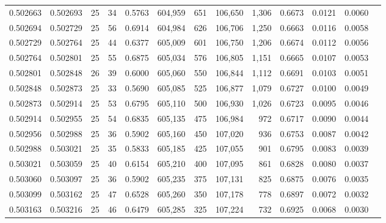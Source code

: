\begin{tabular}{rrrrrrrrrrrrr}
0.502663 & 0.502693 &    25 &  34 &                                     0.5763 & 604,959 &     651 & 106,650 &   1,306 & 0.6673 & 0.0121 & 0.0060 \\
0.502694 & 0.502729 &    25 &  56 &                                     0.6914 & 604,984 &     626 & 106,706 &   1,250 & 0.6663 & 0.0116 & 0.0058 \\
0.502729 & 0.502764 &    25 &  44 &                                     0.6377 & 605,009 &     601 & 106,750 &   1,206 & 0.6674 & 0.0112 & 0.0056 \\
0.502764 & 0.502801 &    25 &  55 &                                     0.6875 & 605,034 &     576 & 106,805 &   1,151 & 0.6665 & 0.0107 & 0.0053 \\
0.502801 & 0.502848 &    26 &  39 &                                     0.6000 & 605,060 &     550 & 106,844 &   1,112 & 0.6691 & 0.0103 & 0.0051 \\
0.502848 & 0.502873 &    25 &  33 &                                     0.5690 & 605,085 &     525 & 106,877 &   1,079 & 0.6727 & 0.0100 & 0.0049 \\
0.502873 & 0.502914 &    25 &  53 &                                     0.6795 & 605,110 &     500 & 106,930 &   1,026 & 0.6723 & 0.0095 & 0.0046 \\
0.502914 & 0.502955 &    25 &  54 &                                     0.6835 & 605,135 &     475 & 106,984 &     972 & 0.6717 & 0.0090 & 0.0044 \\
0.502956 & 0.502988 &    25 &  36 &                                     0.5902 & 605,160 &     450 & 107,020 &     936 & 0.6753 & 0.0087 & 0.0042 \\
0.502988 & 0.503021 &    25 &  35 &                                     0.5833 & 605,185 &     425 & 107,055 &     901 & 0.6795 & 0.0083 & 0.0039 \\
0.503021 & 0.503059 &    25 &  40 &                                     0.6154 & 605,210 &     400 & 107,095 &     861 & 0.6828 & 0.0080 & 0.0037 \\
0.503060 & 0.503097 &    25 &  36 &                                     0.5902 & 605,235 &     375 & 107,131 &     825 & 0.6875 & 0.0076 & 0.0035 \\
0.503099 & 0.503162 &    25 &  47 &                                     0.6528 & 605,260 &     350 & 107,178 &     778 & 0.6897 & 0.0072 & 0.0032 \\
0.503163 & 0.503216 &    25 &  46 &                                     0.6479 & 605,285 &     325 & 107,224 &     732 & 0.6925 & 0.0068 & 0.0030 \\

\end{tabular}
